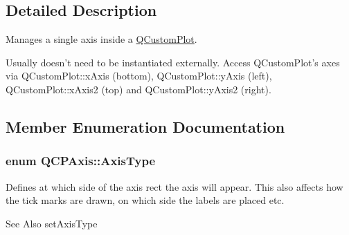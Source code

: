 \subsection{Detailed Description}
Manages a single axis inside a \hyperlink{classQCustomPlot}{Q\-Custom\-Plot}. 

Usually doesn't need to be instantiated externally. Access Q\-Custom\-Plot's axes via Q\-Custom\-Plot\-::x\-Axis (bottom), Q\-Custom\-Plot\-::y\-Axis (left), Q\-Custom\-Plot\-::x\-Axis2 (top) and Q\-Custom\-Plot\-::y\-Axis2 (right). 

\subsection{Member Enumeration Documentation}
\hypertarget{classQCPAxis_ae2bcc1728b382f10f064612b368bc18a}{
\subsubsection[{Axis\-Type}]{\setlength{\rightskip}{0pt plus 5cm}enum {\bf Q\-C\-P\-Axis\-::\-Axis\-Type}}}\label{classQCPAxis_ae2bcc1728b382f10f064612b368bc18a}
Defines at which side of the axis rect the axis will appear. This also affects how the tick marks are drawn, on which side the labels are placed etc. \begin{DoxySeeAlso}{See Also}
set\-Axis\-Type 
\end{DoxySeeAlso}
